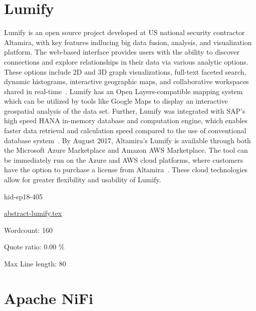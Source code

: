 \section{Lumify}

Lumify is an open source project developed at US national security
contractor Altamira, with key features indlucing big data fusion, 
analysis, and visualization platform. The web-based interface provides users 
with the ability to discover connections and explore relationships in their
data via various analytic options. These options include 2D and 3D
graph visualizations, full-text faceted search, dynamic histograms,
interactive geographic maps, and collaborative workspaces shared in
real-time~\cite{hid-sp18-405-www-lumify}. Lumify has an Open
Layers-compatible mapping system which can be utilized by tools like
Google Maps to display an interactive geospatial analysis of the data
set. Further, Lumify was integrated with SAP's high speed HANA
in-memory database and computation engine, which enables faster data
retrieval and calculation speed compared to the use of conventional
database system~\cite{hid-sp18-405-linkedinblog-lumify}. By August
2017, Altamira's Lumify is available through both the Microsoft Azure
Marketplace and Amazon AWS Marketplace. The tool can be immediately
run on the Azure and AWS cloud platforms, where customers have the
option to purchase a license from 
Altamira~\cite{hid-sp18-405-wwwaws-lumify}\cite{hid-sp18-405-wwwazure-lumify}.
 These cloud technologies allow for greater flexibility and usability of Lumify.


\begin{IU}

hid-sp18-405

\href{https://github.com/cloudmesh-community/hid-sp18-405/blob/master//technology/abstract-lumify.tex}{abstract-lumify.tex}

 

Wordcount: 160


Quote ratio: 0.00 \%
 
Max Line length: 80
\end{IU}

\section{Apache NiFi}

